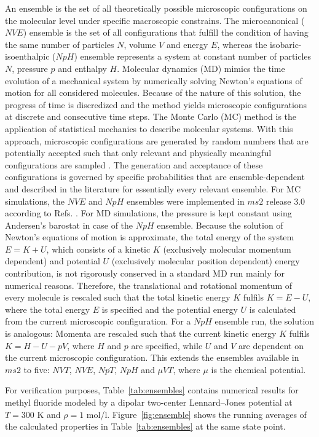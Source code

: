 \documentclass[preprint,12pt]{elsarticle}
\begin{document}
An ensemble is the set of all theoretically possible microscopic configurations on the molecular level under specific macroscopic constrains. The microcanonical ($NVE$) ensemble is the set of all configurations that fulfill the condition of having the same number of particles $N$, volume $V$ and energy $E$, whereas the isobaric-isoenthalpic ($NpH$) ensemble represents a system at constant number of particles $N$, pressure $p$ and enthalpy $H$. Molecular dynamics (MD) mimics the time evolution of a mechanical system by numerically solving Newton's equations of motion for all considered molecules. Because of the nature of this solution, the progress of time is discredized and the method yields microscopic configurations at discrete and consecutive time steps. The Monte Carlo (MC) method is the application of statistical mechanics to describe molecular systems. With this approach, microscopic configurations are generated by random numbers that are potentially accepted such that only relevant and physically meaningful configurations are sampled \cite{fre02}. The generation and acceptance of these configurations is governed by specific probabilities that are ensemble-dependent and described in the literature for essentially every relevant ensemble. For MC simulations, the $NVE$ and $NpH$ ensembles were implemented in $ms2$ release 3.0 according to Refs. \cite{lus98, kri05}. For MD simulations, the pressure is kept constant using Andersen's barostat \cite{and80} in case of the $NpH$ ensemble. Because the solution of Newton's equations of motion is approximate, the total energy of the system $E=K+U$, which consists of a kinetic $K$ (exclusively molecular momentum dependent) and potential $U$ (exclusively molecular position dependent) energy contribution, is not rigorously conserved in a standard MD run mainly for numerical reasons. Therefore, the  translational and rotational momentum of every molecule is rescaled such that the total kinetic energy $K$ fulfils $K=E-U$, where the total energy $E$ is specified and the potential energy $U$ is calculated from the current microscopic configuration. For a $NpH$ ensemble run, the solution is analogous: Momenta are rescaled such that the current kinetic energy $K$ fulfils $K=H-U-pV$, where $H$ and $p$ are specified, while $U$ and $V$ are dependent on the current microscopic configuration. This extends the ensembles available in $ms2$ to five:  $NVT$, $NVE$, $NpT$, $NpH$ and $\mu VT$, where $\mu$ is the chemical potential. 

For verification purposes, Table~\ref{tab:ensembles} contains numerical results for methyl fluoride modeled by a dipolar two-center Lennard--Jones potential \cite{sto03} at $T=300$ K and $\rho=1$ mol/l. Figure~\ref{fig:ensemble} shows the running averages of the calculated properties in Table~\ref{tab:ensembles} at the same state point.
\end{document}
